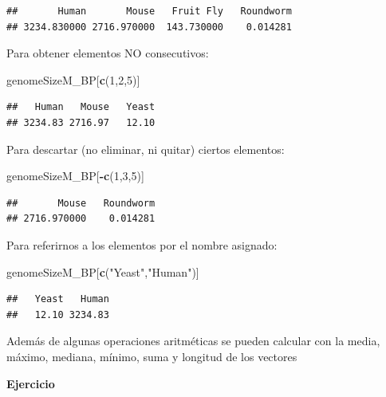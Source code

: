 \documentclass[
]{book}
\newenvironment{Shaded}{\begin{snugshade}}{\end{snugshade}}
\newcommand{\DecValTok}[1]{\textcolor[rgb]{0.00,0.00,0.81}{#1}}
\newcommand{\FunctionTok}[1]{\textcolor[rgb]{0.13,0.29,0.53}{\textbf{#1}}}
\newcommand{\NormalTok}[1]{#1}
\newcommand{\SpecialCharTok}[1]{\textcolor[rgb]{0.81,0.36,0.00}{\textbf{#1}}}
\newcommand{\StringTok}[1]{\textcolor[rgb]{0.31,0.60,0.02}{#1}}
\begin{document}
\begin{verbatim}
##       Human       Mouse   Fruit Fly   Roundworm 
## 3234.830000 2716.970000  143.730000    0.014281
\end{verbatim}

Para obtener elementos NO consecutivos:

\begin{Shaded}
\begin{Highlighting}[]
\NormalTok{genomeSizeM\_BP[}\FunctionTok{c}\NormalTok{(}\DecValTok{1}\NormalTok{,}\DecValTok{2}\NormalTok{,}\DecValTok{5}\NormalTok{)]}
\end{Highlighting}
\end{Shaded}

\begin{verbatim}
##   Human   Mouse   Yeast 
## 3234.83 2716.97   12.10
\end{verbatim}

Para descartar (no eliminar, ni quitar) ciertos elementos:

\begin{Shaded}
\begin{Highlighting}[]
\NormalTok{genomeSizeM\_BP[}\SpecialCharTok{{-}}\FunctionTok{c}\NormalTok{(}\DecValTok{1}\NormalTok{,}\DecValTok{3}\NormalTok{,}\DecValTok{5}\NormalTok{)]}
\end{Highlighting}
\end{Shaded}

\begin{verbatim}
##       Mouse   Roundworm 
## 2716.970000    0.014281
\end{verbatim}

Para referirnos a los elementos por el nombre asignado:

\begin{Shaded}
\begin{Highlighting}[]
\NormalTok{genomeSizeM\_BP[}\FunctionTok{c}\NormalTok{(}\StringTok{"Yeast"}\NormalTok{,}\StringTok{"Human"}\NormalTok{)]}
\end{Highlighting}
\end{Shaded}

\begin{verbatim}
##   Yeast   Human 
##   12.10 3234.83
\end{verbatim}

Además de algunas operaciones aritméticas se pueden calcular con la media, máximo, mediana, mínimo, suma y longitud de los vectores

\textbf{Ejercicio}
\end{document}
